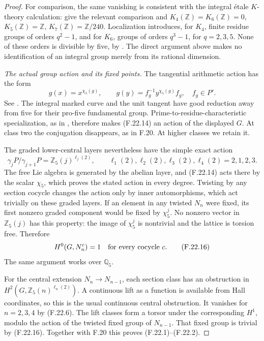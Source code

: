 \begin{proof}
For comparison, the same vanishing is consistent with
the integral étale \(K\)-theory calculation:
\citet[VI, proof of Theorem~8.2 and Table~10.1.1]{FA_Weibel2013}
give the relevant comparison and
\(K_4(\mathbb Z)=K_6(\mathbb Z)=0\),
\(K_5(\mathbb Z)=\mathbb Z\),
\(K_7(\mathbb Z)=\mathbb Z/240\).
Localization introduces, for \(K_4\), finite residue groups
of orders \(q^2-1\), and for \(K_6\), groups of orders
\(q^3-1\), for \(q=2,3,5\). None of these orders is
divisible by five, by
\citet[IV, Corollary~1.13]{FA_Weibel2013}.
The direct argument above makes no identification of an
integral group merely from its rational dimension.

\emph{The actual group action and its fixed points.}
The tangential arithmetic action has the form
\[
 g(x)=x^{\chi_5(g)},\qquad
             g(y)=f_g^{-1}y^{\chi_5(g)}f_g,\quad f_g\in P'.
                                                               \tag{F.22.14}
\]
See \citet[formula~(9)]{FA_Wickelgren2012}.
The integral marked curve and the unit tangent have good
reduction away from five for their pro-five fundamental
group. Prime-to-residue-characteristic specialization,
as in \citet[Exposé~XIII, Corollary~2.9 and \S2.10]{FA_SGA1},
therefore makes (F.22.14) an action of the displayed \(G\).
At class two the conjugation disappears, as in F.20.
At higher classes we retain it.

The graded lower-central layers nevertheless have the
simple exact action
\[
 \gamma_jP/\gamma_{j+1}P
       =\mathbb Z_5(j)^{\ell_j(2)},\qquad
          \ell_1(2),\ell_2(2),\ell_3(2),\ell_4(2)=2,1,2,3 .
                                                               \tag{F.22.15}
\]
The free Lie algebra is generated by the abelian layer,
and (F.22.14) acts there by the scalar \(\chi_5\), which
proves the stated action in every degree. Twisting by any
section cocycle changes the action only by inner
automorphisms, which act trivially on these graded layers.
If an element in any twisted \(N_n\) were fixed, its first
nonzero graded component would be fixed by \(\chi_5^j\).
No nonzero vector in \(\mathbb Z_5(j)\) has this property:
the image of \(\chi_5^j\) is nontrivial and the lattice is
torsion free. Therefore
\[
                  H^0(G,N_n^c)=1
                  \quad\hbox{for every cocycle \(c\)}.          \tag{F.22.16}
\]
The same argument works over \(\mathbb Q_5\).

For the central extension \(N_n\to N_{n-1}\), each section
class has an obstruction in
\(H^2(G,\mathbb Z_5(n)^{\ell_n(2)})\). A continuous lift
as a function is available from Hall coordinates, so
this is the usual continuous central obstruction.
It vanishes for \(n=2,3,4\) by (F.22.6).
The lift classes form a torsor under the corresponding
\(H^1\), modulo the action of the twisted fixed group
of \(N_{n-1}\). That fixed group is trivial by (F.22.16).
Together with F.20 this proves (F.22.1)--(F.22.2).


\end{proof}
